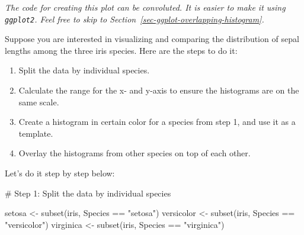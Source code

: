 \documentclass[
  letterpaper,
  DIV=11,
  numbers=noendperiod]{scrreprt}
\newenvironment{Shaded}{\begin{snugshade}}{\end{snugshade}}
\newcommand{\CommentTok}[1]{\textcolor[rgb]{0.37,0.37,0.37}{#1}}
\newcommand{\DecValTok}[1]{\textcolor[rgb]{0.68,0.00,0.00}{#1}}
\newcommand{\FunctionTok}[1]{\textcolor[rgb]{0.28,0.35,0.67}{#1}}
\newcommand{\NormalTok}[1]{\textcolor[rgb]{0.00,0.23,0.31}{#1}}
\newcommand{\OtherTok}[1]{\textcolor[rgb]{0.00,0.23,0.31}{#1}}
\newcommand{\SpecialCharTok}[1]{\textcolor[rgb]{0.37,0.37,0.37}{#1}}
\newcommand{\StringTok}[1]{\textcolor[rgb]{0.13,0.47,0.30}{#1}}
\begin{document}
\emph{The code for creating this plot can be convoluted. It is easier to
make it using \texttt{ggplot2}. Feel free to skip to
Section~\ref{sec-ggplot-overlapping-histogram}.}

Suppose you are interested in visualizing and comparing the distribution
of sepal lengths among the three iris species. Here are the steps to do
it:

\begin{enumerate}
\def\labelenumi{\arabic{enumi}.}
\item
  Split the data by individual species.
\item
  Calculate the range for the x- and y-axis to ensure the histograms are
  on the same scale.
\item
  Create a histogram in certain color for a species from step 1, and use
  it as a template.
\item
  Overlay the histograms from other species on top of each other.
\end{enumerate}

Let's do it step by step below:

\begin{Shaded}
\begin{Highlighting}[]
\CommentTok{\# Step 1: Split the data by individual species}

\NormalTok{setosa }\OtherTok{\textless{}{-}} \FunctionTok{subset}\NormalTok{(iris, Species }\SpecialCharTok{==} \StringTok{"setosa"}\NormalTok{)}
\NormalTok{versicolor }\OtherTok{\textless{}{-}} \FunctionTok{subset}\NormalTok{(iris, Species }\SpecialCharTok{==} \StringTok{"versicolor"}\NormalTok{)}
\NormalTok{virginica }\OtherTok{\textless{}{-}} \FunctionTok{subset}\NormalTok{(iris, Species }\SpecialCharTok{==} \StringTok{"virginica"}\NormalTok{)}
\end{Highlighting}
\end{Shaded}

\begin{Shaded}
\end{Shaded}
\end{document}

